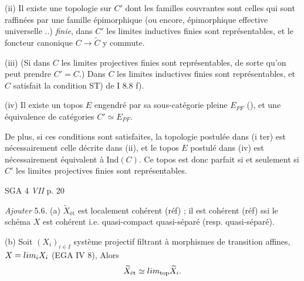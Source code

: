 \documentclass[11pt,a4paper]{article}
\begin{document}

(ii) Il existe une topologie sur $C'$ dont les familles couvrantes sont celles
qui sont raffinées par une famille épimorphique (ou encore, épimorphique
effective universelle ..) \emph{finie}, dans $C'$ les limites inductives finies
sont représentables, et le foncteur canonique $C \to \widetilde{C}$ y commute.

(iii) (Si dans $C$ les limites projectives finies sont représentables, de
sorte qu'on peut prendre $C' = C$.) Dans $C$ les limites inductives finies sont
représentables, et $C$ satisfait la condition ST) de I 8.8 f).

(iv) Il existe un topos $E$ engendré par sa sous-catégorie pleine $E_{PF}$
(\quad), et une équivalence de catégories $C' \simeq E_{PF}$.

De plus, si ces conditions sont satisfaites, la topologie postulée dans (i ter)
est nécessairement celle décrite dans (ii), et le topos $E$ postulé dans (iv)
est nécessairement équivalent à $\mathrm{Ind}(C)$. Ce topos est donc parfait si
et seulement si  $C'$  les limites projectives finies sont
représentables.



SGA 4 \emph{VII} p. 20 \quad {}

\emph{Ajouter} 5.6. (a) $\widetilde{X}_{\text{ét}}$ est localement cohérent
(réf) ; il est cohérent (réf) \struck{\ill{}}  \struck{\ill{}} ssi
le schéma $X$ est  cohérent i.e. quasi-compact
quasi-séparé (resp. quasi-séparé). \struck{\ill{}}

(b) Soit $(X_i)_{i \in I}$ système projectif filtrant à morphismes de transition
affines, $X = \varprojlim_i X_i$ (EGA IV 8), Alors
\[
\widetilde{X}_{\text{ét}} \simeq \varprojlim_{\text{top}} \widetilde{X}_i .
\]
\end{document}
